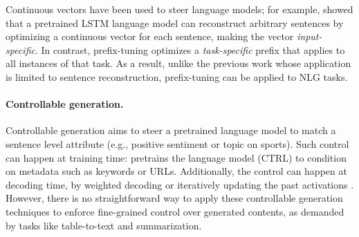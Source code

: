 \documentclass[11pt,a4paper]{article}
\begin{document}
Continuous vectors have been used to steer language models; for example, \citet{subramani2020unconditional} showed that a pretrained LSTM language model can reconstruct arbitrary sentences by optimizing a continuous vector for each sentence, making the vector \emph{input-specific}. In contrast, prefix-tuning optimizes a \emph{task-specific} prefix that applies to all instances of that task. As a result, unlike the previous work whose application is limited to sentence reconstruction, prefix-tuning can be applied to NLG tasks. 
 



\paragraph{Controllable generation.} 
 Controllable generation aims to steer a pretrained language model to match a sentence level attribute (e.g., positive sentiment or topic on sports). Such control can happen at training time: \citet{Keskar2019CTRL} pretrains the language model (CTRL) to condition on metadata such as keywords or URLs. Additionally, the control can happen at decoding time, by weighted decoding \citep[GeDi,][]{KrauseGeDi2020} or iteratively updating the past activations \citep[PPLM,][]{Dathathri2020Plug}. 
 However, there is no straightforward way to apply these controllable generation techniques to enforce fine-grained control over generated contents, as demanded by tasks like table-to-text and summarization.

\end{document}
